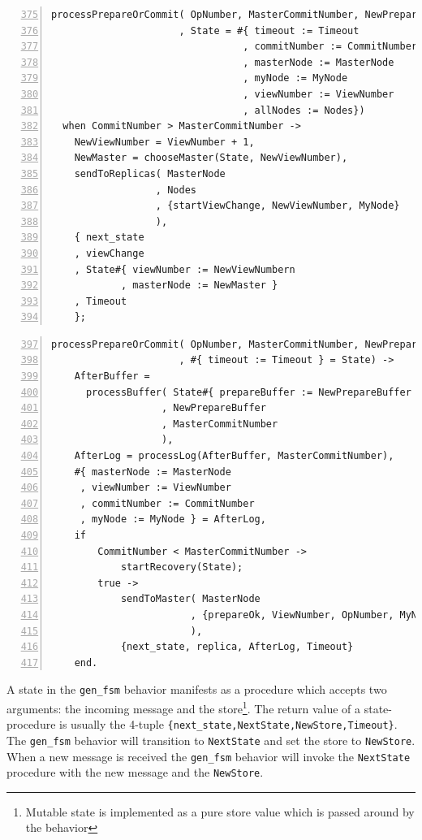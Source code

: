 \documentclass[10pt,letter]{article}
\begin{document}
\begin{lstlisting}[float,caption={Processing the VR Message Queue, Part 1 --- \texttt{vr.erl}},
                   label=lst:processing1, numbers=left, firstnumber=375]
processPrepareOrCommit( OpNumber, MasterCommitNumber, NewPrepareBuffer
                      , State = #{ timeout := Timeout
                                 , commitNumber := CommitNumber
                                 , masterNode := MasterNode
                                 , myNode := MyNode
                                 , viewNumber := ViewNumber
                                 , allNodes := Nodes})
  when CommitNumber > MasterCommitNumber ->
    NewViewNumber = ViewNumber + 1,
    NewMaster = chooseMaster(State, NewViewNumber),
    sendToReplicas( MasterNode
                  , Nodes
                  , {startViewChange, NewViewNumber, MyNode}
                  ),
    { next_state
    , viewChange
    , State#{ viewNumber := NewViewNumbern
            , masterNode := NewMaster }
    , Timeout
    };
\end{lstlisting}
\begin{lstlisting}[float,caption={Processing the VR Message Queue, Part 2 --- \texttt{vr.erl}},
                   label=lst:processing2, numbers=left, firstnumber=397]
processPrepareOrCommit( OpNumber, MasterCommitNumber, NewPrepareBuffer
                      , #{ timeout := Timeout } = State) ->
    AfterBuffer =
      processBuffer( State#{ prepareBuffer := NewPrepareBuffer }
                   , NewPrepareBuffer
                   , MasterCommitNumber
                   ),
    AfterLog = processLog(AfterBuffer, MasterCommitNumber),
    #{ masterNode := MasterNode
     , viewNumber := ViewNumber
     , commitNumber := CommitNumber
     , myNode := MyNode } = AfterLog,
    if
        CommitNumber < MasterCommitNumber ->
            startRecovery(State);
        true ->
            sendToMaster( MasterNode
                        , {prepareOk, ViewNumber, OpNumber, MyNode}
                        ),
            {next_state, replica, AfterLog, Timeout}
    end.
\end{lstlisting}

A state in the \texttt{gen\_fsm} behavior manifests as a procedure which accepts
two arguments: the incoming message and the store\footnote{Mutable state is
  implemented as a pure store value which is passed around by the behavior}. The
return value of a state-procedure is usually the 4-tuple
\lstinline!{next_state,NextState,NewStore,Timeout}!. The \texttt{gen\_fsm}
behavior will transition to \lstinline!NextState! and set the store to
\lstinline!NewStore!. When a new message is received the \texttt{gen\_fsm}
behavior will invoke the \lstinline!NextState! procedure with the new message
and the \lstinline!NewStore!.
\end{document}
